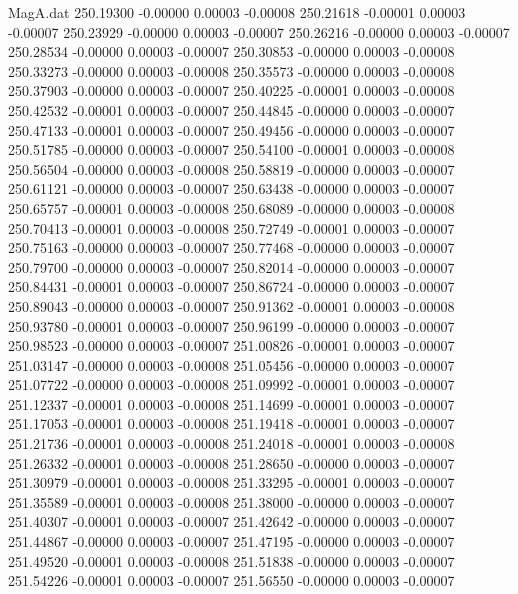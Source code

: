 \begin{filecontents}{MagA.dat}
 250.19300   -0.00000    0.00003   -0.00008
 250.21618   -0.00001    0.00003   -0.00007
 250.23929   -0.00000    0.00003   -0.00007
 250.26216   -0.00000    0.00003   -0.00007
 250.28534   -0.00000    0.00003   -0.00007
 250.30853   -0.00000    0.00003   -0.00008
 250.33273   -0.00000    0.00003   -0.00008
 250.35573   -0.00000    0.00003   -0.00008
 250.37903   -0.00000    0.00003   -0.00007
 250.40225   -0.00001    0.00003   -0.00008
 250.42532   -0.00001    0.00003   -0.00007
 250.44845   -0.00000    0.00003   -0.00007
 250.47133   -0.00001    0.00003   -0.00007
 250.49456   -0.00000    0.00003   -0.00007
 250.51785   -0.00000    0.00003   -0.00007
 250.54100   -0.00001    0.00003   -0.00008
 250.56504   -0.00000    0.00003   -0.00008
 250.58819   -0.00000    0.00003   -0.00007
 250.61121   -0.00000    0.00003   -0.00007
 250.63438   -0.00000    0.00003   -0.00007
 250.65757   -0.00001    0.00003   -0.00008
 250.68089   -0.00000    0.00003   -0.00008
 250.70413   -0.00001    0.00003   -0.00008
 250.72749   -0.00001    0.00003   -0.00007
 250.75163   -0.00000    0.00003   -0.00007
 250.77468   -0.00000    0.00003   -0.00007
 250.79700   -0.00000    0.00003   -0.00007
 250.82014   -0.00000    0.00003   -0.00007
 250.84431   -0.00001    0.00003   -0.00007
 250.86724   -0.00000    0.00003   -0.00007
 250.89043   -0.00000    0.00003   -0.00007
 250.91362   -0.00001    0.00003   -0.00008
 250.93780   -0.00001    0.00003   -0.00007
 250.96199   -0.00000    0.00003   -0.00007
 250.98523   -0.00000    0.00003   -0.00007
 251.00826   -0.00001    0.00003   -0.00007
 251.03147   -0.00000    0.00003   -0.00008
 251.05456   -0.00000    0.00003   -0.00007
 251.07722   -0.00000    0.00003   -0.00008
 251.09992   -0.00001    0.00003   -0.00007
 251.12337   -0.00001    0.00003   -0.00008
 251.14699   -0.00001    0.00003   -0.00007
 251.17053   -0.00001    0.00003   -0.00008
 251.19418   -0.00001    0.00003   -0.00007
 251.21736   -0.00001    0.00003   -0.00008
 251.24018   -0.00001    0.00003   -0.00008
 251.26332   -0.00001    0.00003   -0.00008
 251.28650   -0.00000    0.00003   -0.00007
 251.30979   -0.00001    0.00003   -0.00008
 251.33295   -0.00001    0.00003   -0.00007
 251.35589   -0.00001    0.00003   -0.00008
 251.38000   -0.00000    0.00003   -0.00007
 251.40307   -0.00001    0.00003   -0.00007
 251.42642   -0.00000    0.00003   -0.00007
 251.44867   -0.00000    0.00003   -0.00007
 251.47195   -0.00000    0.00003   -0.00007
 251.49520   -0.00001    0.00003   -0.00008
 251.51838   -0.00000    0.00003   -0.00007
 251.54226   -0.00001    0.00003   -0.00007
 251.56550   -0.00000    0.00003   -0.00007

\end{filecontents}
